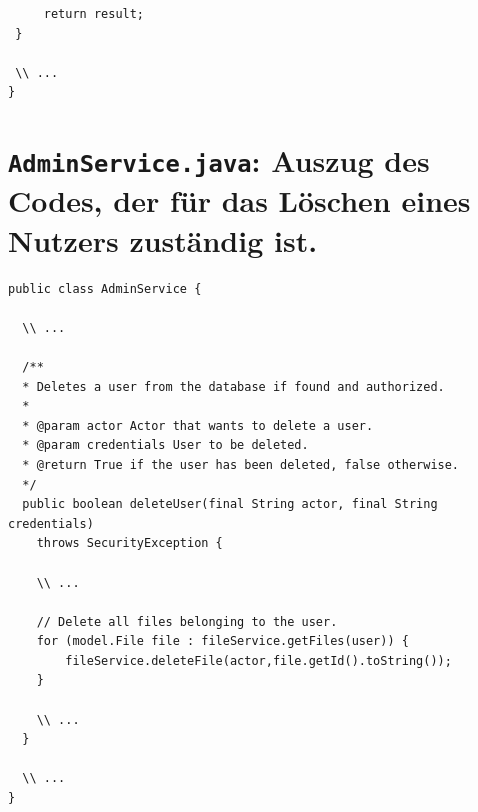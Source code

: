 \documentclass[12pt,DIV14,BCOR10mm,a4paper,parskip=half-,headsepline,headinclude,english,ngerman,bibliography=totocnumbered]{scrreprt}
\begin{document}
\begin{appendices}
\begin{lstlisting}
     return result;
 }

 \\ ...
}
\end{lstlisting}

\section{\texttt{AdminService.java}: Auszug des Codes, der für das Löschen eines Nutzers zuständig ist.}

\label{delete-user-fail}
\begin{lstlisting}
public class AdminService {

  \\ ...

  /**
  * Deletes a user from the database if found and authorized.
  *
  * @param actor Actor that wants to delete a user.
  * @param credentials User to be deleted.
  * @return True if the user has been deleted, false otherwise.
  */
  public boolean deleteUser(final String actor, final String credentials)
    throws SecurityException {

    \\ ...

    // Delete all files belonging to the user.
    for (model.File file : fileService.getFiles(user)) {
        fileService.deleteFile(actor,file.getId().toString());
    }

    \\ ...
  }

  \\ ...
}
\end{lstlisting}

\end{appendices}
\end{document}
